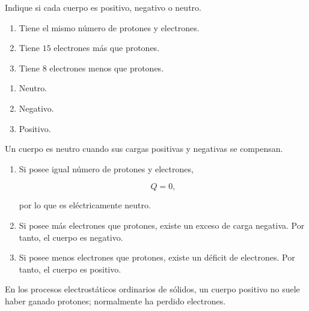 
\begin{ejercicio}

Indique si cada cuerpo es positivo, negativo o neutro.

\begin{enumerate}
    \item Tiene el mismo número de protones y electrones.
    \item Tiene \(15\) electrones más que protones.
    \item Tiene \(8\) electrones menos que protones.
\end{enumerate}

\end{ejercicio}

\begin{respuesta}

\begin{enumerate}
    \item Neutro.
    \item Negativo.
    \item Positivo.
\end{enumerate}

\end{respuesta}

\begin{explicacion}

Un cuerpo es neutro cuando sus cargas positivas y negativas se compensan.

\begin{enumerate}

    \item Si posee igual número de protones y electrones,

    \[
    Q=0,
    \]

    por lo que es eléctricamente neutro.

    \item Si posee más electrones que protones, existe un exceso de carga
    negativa. Por tanto, el cuerpo es negativo.

    \item Si posee menos electrones que protones, existe un déficit de
    electrones. Por tanto, el cuerpo es positivo.

\end{enumerate}

En los procesos electrostáticos ordinarios de sólidos, un cuerpo positivo
no suele haber ganado protones; normalmente ha perdido electrones.

\end{explicacion}


